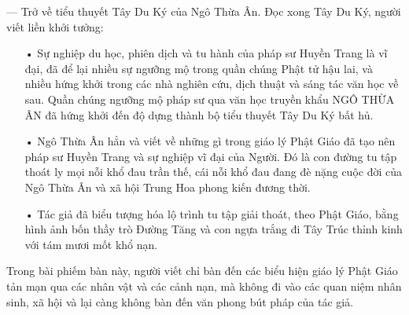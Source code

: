 — Trở về tiểu thuyết Tây Du Ký của Ngô Thừa Ân. Đọc xong Tây Du Ký, người viết liền khởi tưởng:

\begin{itemize}
   \item[•] Sự nghiệp du học, phiên dịch và tu hành của pháp sư Huyền Trang là vĩ đại, đã để lại nhiều sự ngưỡng mộ trong quần chúng Phật tử hậu lai, và nhiều hứng khởi trong các nhà nghiên cứu, dịch thuật và sáng tác văn học về sau. Quần chúng ngưỡng mộ pháp sư qua văn học truyền khẩu NGÔ THỪA ÂN đã hứng khởi đến độ dựng thành bộ tiểu thuyết Tây Du Ký bất hủ.

   \item[•] Ngô Thừa Ân hẳn và viết về những gì trong giáo lý Phật Giáo đã tạo nên pháp sư Huyền Trang và sự nghiệp vĩ đại của Người. Đó là con đường tu tập thoát ly mọi nỗi khổ đau trần thế, cái nỗi khổ đau đang đè nặng cuộc đời của Ngô Thừa Ân và xã hội Trung Hoa phong kiến đương thời.

   \item[•] Tác giả đã biểu tượng hóa lộ trình tu tập giải thoát, theo Phật Giáo, bằng hình ảnh bốn thầy trò Đường Tăng và con ngựa trắng đi Tây Trúc thỉnh kinh với tám mươi mốt khổ nạn.
\end{itemize}

Trong bài phiếm bàn này, người viết chỉ bàn đến các biểu hiện giáo lý Phật Giáo tản mạn qua các nhân vật và các cảnh nạn, mà không đi vào các quan niệm nhân sinh, xã hội và lại càng không bàn đến văn phong bút pháp của tác giả.

